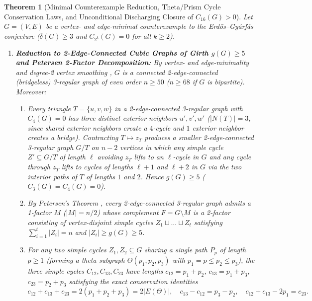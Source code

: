 \documentclass[10pt,a4paper]{article}
\newtheorem{theorem}{Theorem}[section]
\theoremstyle{definition}
\theoremstyle{remark}
\begin{document}
\begin{theorem}[Minimal Counterexample Reduction, Theta/Prism Cycle Conservation Laws, and Unconditional Discharging Closure of $C_{16}(G) > 0$]\label{thm:discharging_c16}
Let $G = (V, E)$ be a vertex- and edge-minimal counterexample to the Erd\H{o}s--Gy\'arf\'as conjecture ($\delta(G) \ge 3$ and $C_{2^k}(G) = 0$ for all $k \ge 2$).
\begin{enumerate}[label=(\alph*),nosep]
  \item \textbf{Reduction to 2-Edge-Connected Cubic Graphs of Girth $g(G) \ge 5$ and Petersen 2-Factor Decomposition:}
  By vertex- and edge-minimality and degree-2 vertex smoothing \cite{markstrom2004extremal,ducoffe2026structured}, $G$ is a connected 2-edge-connected (bridgeless) 3-regular graph of even order $n \ge 50$ ($n \ge 68$ if $G$ is bipartite). Moreover:
  \begin{enumerate}[label=(\roman*),nosep]
    \item Every triangle $T = \{u, v, w\}$ in a 2-edge-connected 3-regular graph with $C_4(G) = 0$ has three distinct exterior neighbors $u', v', w'$ ($|N(T)| = 3$, since shared exterior neighbors create a $4$-cycle and $1$ exterior neighbor creates a bridge). Contracting $T \mapsto z_T$ produces a smaller 2-edge-connected 3-regular graph $G/T$ on $n - 2$ vertices in which any simple cycle $Z' \subseteq G/T$ of length $\ell$ avoiding $z_T$ lifts to an $\ell$-cycle in $G$ and any cycle through $z_T$ lifts to cycles of lengths $\ell + 1$ and $\ell + 2$ in $G$ via the two interior paths of $T$ of lengths $1$ and $2$. Hence $g(G) \ge 5$ ($C_3(G) = C_4(G) = 0$).
    \item By Petersen's Theorem \cite{petersen1891theorie}, every 2-edge-connected 3-regular graph admits a 1-factor $M$ ($|M| = n/2$) whose complement $F = G \setminus M$ is a 2-factor consisting of vertex-disjoint simple cycles $Z_1 \sqcup \dots \sqcup Z_t$ satisfying $\sum_{i=1}^t |Z_i| = n$ and $|Z_i| \ge g(G) \ge 5$.
    \item For any two simple cycles $Z_1, Z_2 \subseteq G$ sharing a single path $P_p$ of length $p \ge 1$ (forming a theta subgraph $\Theta(p_1, p_2, p_3)$ with $p_1 = p \le p_2 \le p_3$), the three simple cycles $C_{12}, C_{13}, C_{23}$ have lengths $c_{12} = p_1 + p_2$, $c_{13} = p_1 + p_3$, $c_{23} = p_2 + p_3$ satisfying the exact conservation identities
    \begin{equation}\label{eq:theta_conservation}
      c_{12} + c_{13} + c_{23} = 2(p_1 + p_2 + p_3) = 2|E(\Theta)|, \quad c_{13} - c_{12} = p_3 - p_2, \quad c_{12} + c_{13} - 2p_1 = c_{23}.

\end{equation}
\end{enumerate}
\end{enumerate}
\end{theorem}
\end{document}
